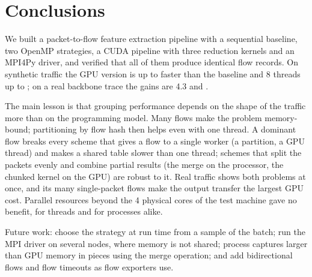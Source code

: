 \section{Conclusions}
We built a packet-to-flow feature extraction pipeline with a sequential
baseline, two OpenMP strategies, a CUDA pipeline with three reduction kernels
and an MPI4Py driver, and verified that all of them produce identical flow
records. On synthetic traffic the GPU version is up to \sizeChunkSp\x{} faster
than the baseline and 8 threads up to \skewPartSpZero\x; on a real backbone
trace the gains are 4.3\x{} and \realPartSp\x.

The main lesson is that grouping performance depends on the shape of the
traffic more than on the programming model. Many flows make the problem
memory-bound; partitioning by flow hash then helps even with one thread. A
dominant flow breaks every scheme that gives a flow to a single worker
(a partition, a GPU thread) and makes a shared table slower than one thread;
schemes that split the packets evenly and combine partial results (the merge
on the processor, the chunked kernel on the GPU) are robust to it. Real traffic
shows both problems at once, and its many single-packet flows make the output
transfer the largest GPU cost. Parallel resources beyond the 4 physical cores
of the test machine gave no benefit, for threads and for processes alike.

Future work: choose the strategy at run time from a sample of the batch; run
the MPI driver on several nodes, where memory is not shared; process
captures larger than GPU memory in pieces using the merge operation; and add
bidirectional flows and flow timeouts as flow exporters use.
